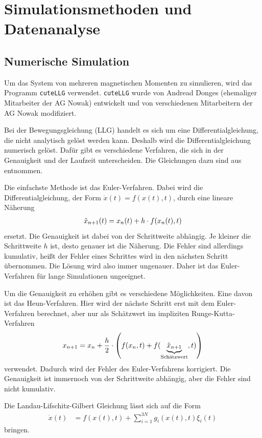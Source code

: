 \documentclass[main.tex]{subfiles}
\begin{document}
\newpage
\section{Simulationsmethoden und Datenanalyse}

\subsection{Numerische Simulation}
Um das System von mehreren magnetischen Momenten zu simulieren, wird das Programm \texttt{cuteLLG}\cite{cuteLLG} verwendet. \texttt{cuteLLG} wurde von Andread Donges (ehemaliger Mitarbeiter der AG Nowak) entwickelt und von verschiedenen Mitarbeitern der AG Nowak modifiziert.


Bei der Bewegungsgleichung (LLG) handelt es sich um eine Differentialgleichung, die nicht analytisch gelöst werden kann.
Deshalb wird die Differentialgleichung numerisch gelöst. Dafür gibt es verschiedene Verfahren, die sich in der Genauigkeit und der Laufzeit unterscheiden. 
Die Gleichungen dazu sind aus \cite{Computerphysik} entnommen.

Die einfachste Methode ist das Euler-Verfahren. Dabei wird die
Differentialgleichung, der Form \(\Dot{x}(t) = f(x(t),t)\), durch eine lineare Näherung 
\begin{align}
    \Tilde{x}_{n+1}(t) = x_n(t) + h \cdot f(x_n(t),t)
\end{align}
ersetzt. Die Genauigkeit ist dabei von der Schrittweite abhängig. Je kleiner die Schrittweite \(h\) ist, desto genauer ist die Näherung. 
Die Fehler sind allerdings kumulativ, heißt der Fehler eines Schrittes wird in den nächsten Schritt übernommen. Die Lösung wird also immer ungenauer.
Daher ist das Euler-Verfahren für lange Simulationen ungeeignet.

Um die Genauigkeit zu erhöhen gibt es verschiedene Möglichkeiten. Eine davon ist das Heun-Verfahren. Hier wird der nächste Schritt erst mit dem Euler-Verfahren berechnet, aber nur als Schätzwert im impliziten Runge-Kutta-Verfahren 
\begin{align}
    x_{n+1} = x_n + \frac{h}{2} \cdot \qty(f(x_n,t) + f(\underbrace{\Tilde{x}_{n+1}}_\text{Schätzwert},t))
\end{align}
verwendet. Dadurch wird der Fehler des Euler-Verfahrens korrigiert. Die Genauigkeit ist immernoch von der Schrittweite abhängig, aber die Fehler sind nicht kumulativ.

Die Landau-Lifschitz-Gilbert Gleichung lässt sich auf die Form
\begin{align}
    \Dot{x}(t) &= f(x(t),t) + \sum_{i=1}^{3N} g_i(x(t),t) \xi_i(t)
\end{align}
bringen. 
\end{document}
